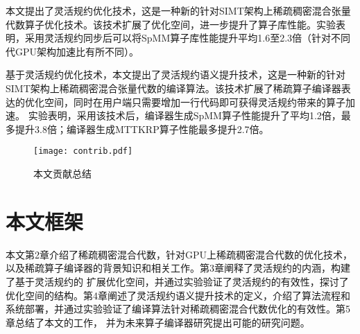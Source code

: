 本文提出了灵活规约优化技术，这是一种新的针对SIMT架构上稀疏稠密混合张量代数算子优化技术。该技术扩展了优化空间，进一步提升了算子库性能。实验表明，采用灵活规约同步后可以将SpMM算子库性能提升平均1.6至2.3倍（针对不同代GPU架构加速比有所不同）。

基于灵活规约优化技术，本文提出了灵活规约语义提升技术，这是一种新的针对SIMT架构上稀疏稠密混合张量代数的编译算法。该技术扩展了稀疏算子编译器表达的优化空间，同时在用户端只需要增加一行代码即可获得灵活规约带来的算子加速。
实验表明，采用该技术后，编译器生成SpMM算子性能提升了平均1.2倍，最多提升3.8倍；编译器生成MTTKRP算子性能最多提升2.7倍。

\begin{figure}
  \centering
  \texttt{[image: contrib.pdf]}
  \caption{本文贡献总结}
  \label{fig:contrib}
\end{figure}

\section{本文框架}
本文第2章介绍了稀疏稠密混合代数，针对GPU上稀疏稠密混合代数的优化技术，以及稀疏算子编译器的背景知识和相关工作。第3章阐释了灵活规约的内涵，构建了基于灵活规约的
扩展优化空间，并通过实验验证了灵活规约的有效性，探讨了优化空间的结构。第4章阐述了灵活规约语义提升技术的定义，介绍了算法流程和系统部署，并通过实验验证了编译算法针对稀疏稠密混合代数优化的有效性。第5章总结了本文的工作，
并为未来算子编译器研究提出可能的研究问题。
